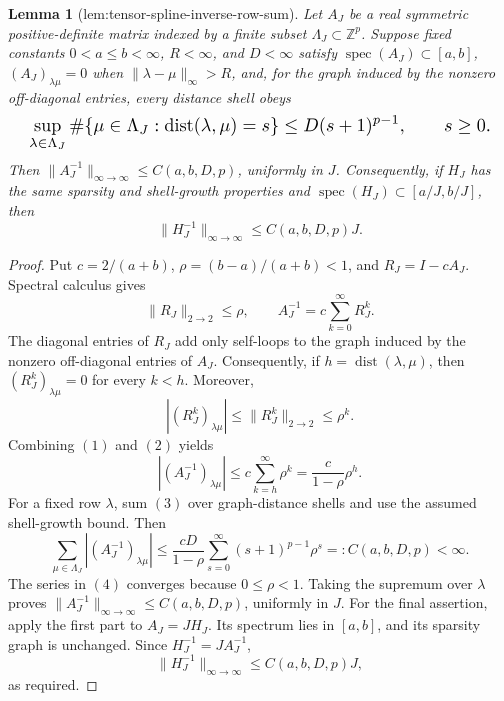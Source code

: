 \documentclass{article}
\newtheorem{lemma}{Lemma}
\begin{document}
\begin{lemma}[lem:tensor-spline-inverse-row-sum]\label{lem:tensor-spline-inverse-row-sum}
Let \(A_J\) be a real symmetric positive-definite matrix indexed by a finite subset \(\Lambda_J\subset\mathbb Z^p\). Suppose fixed constants \(0<a\le b<\infty\), \(R<\infty\), and \(D<\infty\) satisfy \(\operatorname{spec}(A_J)\subset[a,b]\), \((A_J)_{\lambda\mu}=0\) when \(\lVert\lambda-\mu\rVert_\infty>R\), and, for the graph induced by the nonzero off-diagonal entries, every distance shell obeys
\[
\makebox[\linewidth][c]{\resizebox{0.98\linewidth}{!}{\par\noindent \makebox[\linewidth][c]{\resizebox{0.98\linewidth}{!}{\(\displaystyle \displaystyle \sup_{\lambda\in\Lambda_J}\#\{\mu\in\Lambda_J:\operatorname{dist}(\lambda,\mu)=s\}\le D(s+1)^{p-1},\qquad s\ge0.\)}}\par\noindent}}
\]
Then \(\lVert A_J^{-1}\rVert_{\infty\to\infty}\le C(a,b,D,p)\), uniformly in \(J\). Consequently, if \(H_J\) has the same sparsity and shell-growth properties and \(\operatorname{spec}(H_J)\subset[a/J,b/J]\), then
\[
\lVert H_J^{-1}\rVert_{\infty\to\infty}\le C(a,b,D,p)J.
\]
\end{lemma}
\begin{proof}
Put \(c=2/(a+b)\), \(\rho=(b-a)/(a+b)<1\), and \(R_J=I-cA_J\). Spectral calculus gives
\[\lVert R_J\rVert_{2\to2}\le\rho,\qquad A_J^{-1}=c\sum_{k=0}^{\infty}R_J^k.\tag{1}\]
The diagonal entries of \(R_J\) add only self-loops to the graph induced by the nonzero off-diagonal entries of \(A_J\). Consequently, if \(h=\operatorname{dist}(\lambda,\mu)\), then \((R_J^k)_{\lambda\mu}=0\) for every \(k<h\). Moreover,
\[|(R_J^k)_{\lambda\mu}|\le\lVert R_J^k\rVert_{2\to2}\le\rho^k.\tag{2}\]
Combining \((1)\) and \((2)\) yields
\[|(A_J^{-1})_{\lambda\mu}|\le c\sum_{k=h}^{\infty}\rho^k=\frac{c}{1-\rho}\rho^h.\tag{3}\]
For a fixed row \(\lambda\), sum \((3)\) over graph-distance shells and use the assumed shell-growth bound. Then
\[\sum_{\mu\in\Lambda_J}|(A_J^{-1})_{\lambda\mu}|\le\frac{cD}{1-\rho}\sum_{s=0}^{\infty}(s+1)^{p-1}\rho^s=:C(a,b,D,p)<\infty.\tag{4}\]
The series in \((4)\) converges because \(0\le\rho<1\). Taking the supremum over \(\lambda\) proves \(\lVert A_J^{-1}\rVert_{\infty\to\infty}\le C(a,b,D,p)\), uniformly in \(J\). For the final assertion, apply the first part to \(A_J=JH_J\). Its spectrum lies in \([a,b]\), and its sparsity graph is unchanged. Since \(H_J^{-1}=J A_J^{-1}\),
\[\lVert H_J^{-1}\rVert_{\infty\to\infty}\le C(a,b,D,p)J,\]
as required.
\end{proof}
\end{document}

